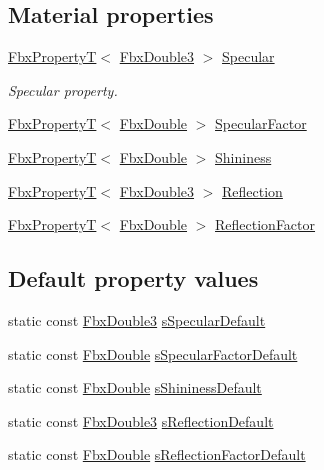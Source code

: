 \subsection*{Material properties}
\begin{DoxyCompactItemize}
\item 
\hyperlink{class_fbx_property_t}{Fbx\+PropertyT}$<$ \hyperlink{fbxtypes_8h_ae0a96f14cde566774c7553aa7523b7a7}{Fbx\+Double3} $>$ \hyperlink{class_fbx_surface_phong_a2f845bd60215d282c415e2129034e79e}{Specular}
\begin{DoxyCompactList}\small\item\em Specular property. \end{DoxyCompactList}\item 
\hyperlink{class_fbx_property_t}{Fbx\+PropertyT}$<$ \hyperlink{fbxtypes_8h_a171e72a1c46fc15c1a6c9c31948c1c5b}{Fbx\+Double} $>$ \hyperlink{class_fbx_surface_phong_a821efe9075d1d6ee22d3ab72ab303eaa}{Specular\+Factor}
\item 
\hyperlink{class_fbx_property_t}{Fbx\+PropertyT}$<$ \hyperlink{fbxtypes_8h_a171e72a1c46fc15c1a6c9c31948c1c5b}{Fbx\+Double} $>$ \hyperlink{class_fbx_surface_phong_ae92be9749116e7eedecb2447b6401d7d}{Shininess}
\item 
\hyperlink{class_fbx_property_t}{Fbx\+PropertyT}$<$ \hyperlink{fbxtypes_8h_ae0a96f14cde566774c7553aa7523b7a7}{Fbx\+Double3} $>$ \hyperlink{class_fbx_surface_phong_a67159f889406ad672d13e463e840a9ba}{Reflection}
\item 
\hyperlink{class_fbx_property_t}{Fbx\+PropertyT}$<$ \hyperlink{fbxtypes_8h_a171e72a1c46fc15c1a6c9c31948c1c5b}{Fbx\+Double} $>$ \hyperlink{class_fbx_surface_phong_a87608ae7193bbac4f63c97f6c5f1dee2}{Reflection\+Factor}
\end{DoxyCompactItemize}
\subsection*{Default property values}
\begin{DoxyCompactItemize}
\item 
static const \hyperlink{fbxtypes_8h_ae0a96f14cde566774c7553aa7523b7a7}{Fbx\+Double3} \hyperlink{class_fbx_surface_phong_ab42f5855747a5699e65b6dd6332b3f70}{s\+Specular\+Default}
\item 
static const \hyperlink{fbxtypes_8h_a171e72a1c46fc15c1a6c9c31948c1c5b}{Fbx\+Double} \hyperlink{class_fbx_surface_phong_a4906b3c1de363105b0e0c32be098b7a5}{s\+Specular\+Factor\+Default}
\item 
static const \hyperlink{fbxtypes_8h_a171e72a1c46fc15c1a6c9c31948c1c5b}{Fbx\+Double} \hyperlink{class_fbx_surface_phong_ad73d54cca213c728a5c5e88e74cf9bd3}{s\+Shininess\+Default}
\item 
static const \hyperlink{fbxtypes_8h_ae0a96f14cde566774c7553aa7523b7a7}{Fbx\+Double3} \hyperlink{class_fbx_surface_phong_a0513a220ce6a0cc31124637008b637bc}{s\+Reflection\+Default}
\item 
static const \hyperlink{fbxtypes_8h_a171e72a1c46fc15c1a6c9c31948c1c5b}{Fbx\+Double} \hyperlink{class_fbx_surface_phong_a7fa1d3af6e4814d255726194b6ebb968}{s\+Reflection\+Factor\+Default}
\end{DoxyCompactItemize}
